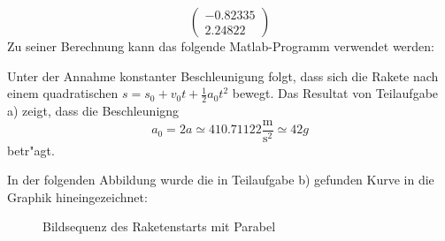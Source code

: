 \begin{loesung}
\begin{teilaufgaben}
\[\begin{pmatrix}
    -0.82335\\
     2.24822
\end{pmatrix}
\]
Zu seiner Berechnung kann das folgende Matlab-Programm verwendet werden:
\item
Unter der Annahme konstanter Beschleunigung folgt,  dass sich die
Rakete nach einem quadratischen $s=s_0+v_0t+\frac12a_0t^2$ bewegt.
Das Resultat von Teilaufgabe a) zeigt, dass die Beschleunigng
\[
a_0=2a\simeq410.71122\frac{\text{m}}{\text{s}^2}\simeq42g
\]
betr"agt.
\end{teilaufgaben}
In der folgenden Abbildung wurde die in Teilaufgabe b) gefunden Kurve
in die Graphik hineingezeichnet:
\qedhere
\begin{figure}
\begin{center}
\end{center}
\caption{Bildsequenz des Raketenstarts mit Parabel\label{bildmitkurve}}
\end{figure}
\end{loesung}

